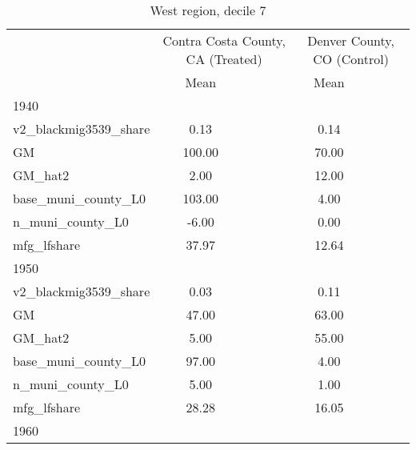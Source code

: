 \begin{table}[htbp]\centering
\def\sym#1{\ifmmode^{#1}\else\(^{#1}\)\fi}
\caption{West region, decile 7 \label{tab1}}
\begin{tabular}{l*{2}{ccc}}
\toprule
                    &\multicolumn{3}{c}{Contra Costa County, CA (Treated)}&\multicolumn{3}{c}{Denver County, CO (Control)}\\
                    &        Mean&            &            &        Mean&            &            \\
\midrule
1940                &            &            &            &            &            &            \\
v2\_blackmig3539\_share&        0.13&            &            &        0.14&            &            \\
GM                  &      100.00&            &            &       70.00&            &            \\
GM\_hat2             &        2.00&            &            &       12.00&            &            \\
base\_muni\_county\_L0 &      103.00&            &            &        4.00&            &            \\
n\_muni\_county\_L0    &       -6.00&            &            &        0.00&            &            \\
mfg\_lfshare         &       37.97&            &            &       12.64&            &            \\
\midrule
1950                &            &            &            &            &            &            \\
v2\_blackmig3539\_share&        0.03&            &            &        0.11&            &            \\
GM                  &       47.00&            &            &       63.00&            &            \\
GM\_hat2             &        5.00&            &            &       55.00&            &            \\
base\_muni\_county\_L0 &       97.00&            &            &        4.00&            &            \\
n\_muni\_county\_L0    &        5.00&            &            &        1.00&            &            \\
mfg\_lfshare         &       28.28&            &            &       16.05&            &            \\
\midrule
1960                &            &            &            &            &            &            \\

\end{tabular}
\end{table}
